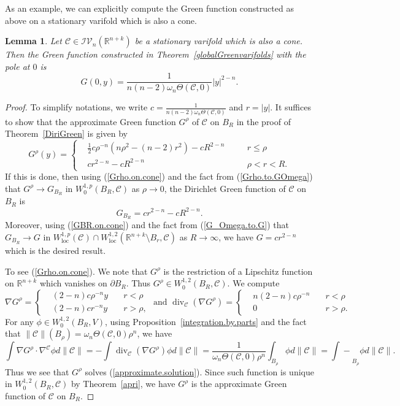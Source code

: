 \documentclass[11pt]{amsart}
\newtheorem{lemma}[theorem]{Lemma}
\theoremstyle{definition}
\newcommand{\R}{\mathbb{R}}
\newcommand{\C}{\mathcal{C}}
\newcommand{\IV}{\mathcal{IV}}
\newcommand{\loc}{\mathrm{loc}}
\newcommand{\fint}{\mathrel{\int\!\!\!\!\!\!-}}
\DeclareMathOperator{\Div}{div}
\begin{document}
As an example, we can explicitly compute the Green function constructed as above on a stationary varifold which is also a cone.
\begin{lemma}\label{cone}
	Let $\C\in \IV_n(\R^{n+k})$ be a stationary varifold which is also a cone. Then the Green function constructed in Theorem~\ref{globalGreenvarifolds} with the pole at $0$ is 
	\[G(0,y)=\frac{1}{n(n-2)\omega_n\Theta(\C,0)}|y|^{2-n}.\]
\end{lemma}
\begin{proof}
	To simplify notations, we write $c=\frac{1}{n(n-2)\omega_n\Theta(\C,0)}$ and $r=|y|$. It suffices to show that the approximate Green function $G^\rho$ of $\C$ on $B_R$ in the proof of Theorem~\ref{DiriGreen} is given by 
	\begin{equation}\label{Grho.on.cone}
		G^\rho (y)=\left\{\begin{aligned}
			&\frac{1}{2}c\rho^{-n}(n\rho^2-(n-2)r^2)-cR^{2-n} &\quad &r\le \rho\\
			&cr^{2-n}-cR^{2-n} &\quad &\rho<r<R.
		\end{aligned}\right.
	\end{equation}
	If this is done, then using (\ref{Grho.on.cone}) and the fact from (\ref{Grho.to.GOmega}) that $G^\rho\to G_{B_R}$ in $W^{1,p}_0( B_R,\C)$ as $\rho\to0$, the Dirichlet Green function of $\C$ on $B_R$ is
	\begin{equation}\label{GBR.on.cone}
		G_{B_R}=cr^{2-n}-cR^{2-n}.
	\end{equation}
	Moreover, using (\ref{GBR.on.cone}) and the fact from (\ref{G_Omega.to.G}) that $G_{B_R}\to G$ in $W^{1,p}_\loc(\C)\cap W^{1,2}_\loc (\R^{n+k}\setminus B_r,\C)$ as $R\to\infty$, we have $G=cr^{2-n}$ which is the desired result.
	
	To see (\ref{Grho.on.cone}). We note that $G^{\rho}$ is the restriction of a Lipschitz function on $\R^{n+k}$ which vanishes on $\partial B_R$. Thus $G^\rho \in W^{1,2}_0( B_R,\C)$. We compute \[\nabla G^{\rho}=\left\{\begin{aligned}
		&(2-n)c\rho^{-n}y&\quad r<\rho\\
		&(2-n)cr^{-n}y&\quad r>\rho,
	\end{aligned}\right.
	\text{ and }\Div_\C(\nabla G^{\rho})= \left\{\begin{aligned}
		&n(2-n)c\rho^{-n}&\quad r<\rho\\
		&0&\quad r>\rho.
	\end{aligned}\right.\]
	For any $\phi\in W_0^{1,2} ( B_R,V)$, using Proposition~\ref{integration.by.parts} and the fact that $\|\C\|(B_\rho)=\omega_n \Theta(\C,0)\rho^n$, we have 
	\[\int \nabla G^\rho\cdot \nabla^\C \phi d\|\C\|=-\int \Div_\C (\nabla G^\rho)\phi d\|\C\|=\frac{1}{\omega_n \Theta(\C,0)\rho^n}\int_{B_\rho}\phi d\|\C\|=\fint _{B_\rho}\phi d\|\C\|.\]
	Thus we see that $G^\rho$ solves (\ref{approximate.solution}). Since such function is unique in $W_0^{1,2}(B_R,\C)$ by Theorem~\ref{apri}, we have $G^{\rho}$ is the approximate Green function of $\C$ on $B_R$.
\end{proof}
\end{document}
